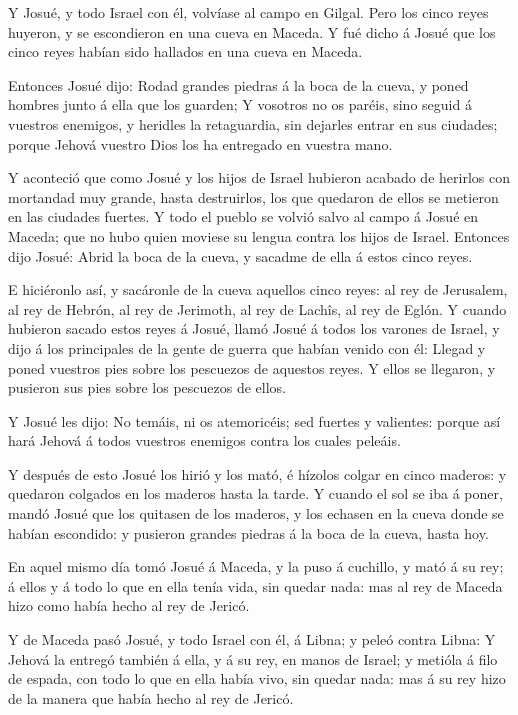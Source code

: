  Y Josué, y todo Israel con él, volvíase al campo en
Gilgal.  Pero los cinco reyes huyeron, y se escondieron en
una cueva en Maceda.  Y fué dicho á Josué que los cinco
reyes habían sido hallados en una cueva en Maceda.

 Entonces Josué dijo: Rodad grandes piedras á la boca de la
cueva, y poned hombres junto á ella que los guarden;  Y
vosotros no os paréis, sino seguid á vuestros enemigos, y heridles la
retaguardia, sin dejarles entrar en sus ciudades; porque Jehová vuestro
Dios los ha entregado en vuestra mano.

 Y aconteció que como Josué y los hijos de Israel hubieron
acabado de herirlos con mortandad muy grande, hasta destruirlos, los que
quedaron de ellos se metieron en las ciudades fuertes.  Y
todo el pueblo se volvió salvo al campo á Josué en Maceda; que no hubo
quien moviese su lengua contra los hijos de Israel. 
Entonces dijo Josué: Abrid la boca de la cueva, y sacadme de ella á
estos cinco reyes.

 E hiciéronlo así, y sacáronle de la cueva aquellos cinco
reyes: al rey de Jerusalem, al rey de Hebrón, al rey de Jerimoth, al rey
de Lachîs, al rey de Eglón.  Y cuando hubieron sacado estos
reyes á Josué, llamó Josué á todos los varones de Israel, y dijo á los
principales de la gente de guerra que habían venido con él: Llegad y
poned vuestros pies sobre los pescuezos de aquestos reyes. Y ellos se
llegaron, y pusieron sus pies sobre los pescuezos de ellos.

 Y Josué les dijo: No temáis, ni os atemoricéis; sed
fuertes y valientes: porque así hará Jehová á todos vuestros enemigos
contra los cuales peleáis.

 Y después de esto Josué los hirió y los mató, é hízolos
colgar en cinco maderos: y quedaron colgados en los maderos hasta la
tarde.  Y cuando el sol se iba á poner, mandó Josué que los
quitasen de los maderos, y los echasen en la cueva donde se habían
escondido: y pusieron grandes piedras á la boca de la cueva, hasta hoy.

 En aquel mismo día tomó Josué á Maceda, y la puso á
cuchillo, y mató á su rey; á ellos y á todo lo que en ella tenía vida,
sin quedar nada: mas al rey de Maceda hizo como había hecho al rey de
Jericó.

 Y de Maceda pasó Josué, y todo Israel con él, á Libna; y
peleó contra Libna:  Y Jehová la entregó también á ella, y
á su rey, en manos de Israel; y metióla á filo de espada, con todo lo
que en ella había vivo, sin quedar nada: mas á su rey hizo de la manera
que había hecho al rey de Jericó.

